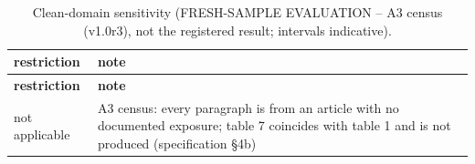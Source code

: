 \begingroup\footnotesize
\begin{longtable}{>{\raggedright\arraybackslash}p{109.0pt}>{\raggedright\arraybackslash}p{322.0pt}}
\caption{Clean-domain sensitivity (FRESH-SAMPLE EVALUATION -- A3 census (v1.0r3), not the registered result; intervals indicative).} \\
\toprule
\textbf{restriction} & \textbf{note} \\
\midrule
\endfirsthead
\toprule
\textbf{restriction} & \textbf{note} \\
\midrule
\endhead
\bottomrule
\endfoot
not applicable & A3 census:\allowbreak{} every paragraph is from an article with no documented exposure; table 7 coincides with table 1 and is not produced (specification §4b) \\
\end{longtable}
\endgroup
